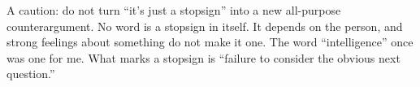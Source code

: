 A caution: do not turn ``it's just a stopsign'' into a new all-purpose counterargument. No word is a stopsign in itself. It depends on the person, and strong feelings about something do not make it one. The word ``intelligence'' once was one for me. What marks a stopsign is ``failure to consider the obvious next question.'' 
